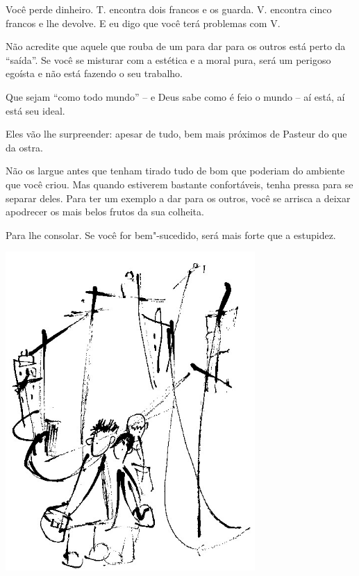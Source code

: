 \bigskip
\bigskip

Você perde dinheiro. T. encontra dois francos e os guarda. V. encontra
cinco francos e lhe devolve. E eu digo que você terá problemas com V.

\bigskip
\bigskip

Não acredite que aquele que rouba de um para dar para os outros está
perto da ``saída''. Se você se misturar com a estética e a moral pura,
será um perigoso egoísta e não está fazendo o seu trabalho.

\bigskip
\bigskip

Que sejam ``como todo mundo'' -- e Deus sabe como é feio o mundo -- aí
está, aí está seu ideal.

\bigskip
\bigskip

Eles vão lhe surpreender: apesar de tudo, bem mais próximos de Pasteur
do que da ostra.

\bigskip
\bigskip

Não os largue antes que tenham tirado tudo de bom que poderiam do
ambiente que você criou. Mas quando estiverem bastante confortáveis,
tenha pressa para se separar deles. Para ter um exemplo a dar para os
outros, você se arrisca a deixar apodrecer os mais belos frutos da sua
colheita.

\bigskip
\bigskip

Para lhe consolar. Se você for bem"-sucedido, será mais forte que a
estupidez.

\bigskip
\bigskip

\pagebreak
\thispagestyle{empty}

\begin{vplace}[.50]
\begin{center}
\includegraphics[width=95mm]{./imgs/Image_12.jpg}
\end{center}
\end{vplace}

